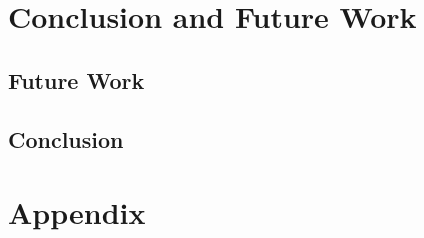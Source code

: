 \documentclass[runningheads]{llncs}
\begin{document}
\section{Conclusion and Future Work}
\label{sse:conclusion}

\subsection{Future Work}
\label{sss:future_work}

\subsection{Conclusion}
\label{sss:conclusion}


\section{Appendix}
\end{document}
